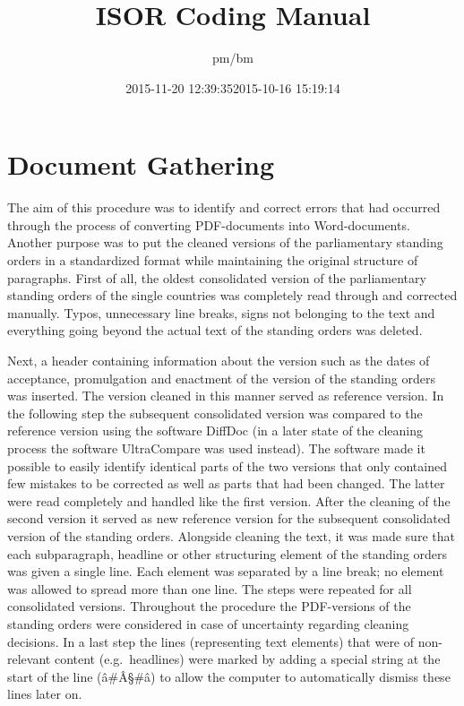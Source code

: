 \documentclass[]{article}
\title{ISOR Coding Manual}
\author{pm/bm}
\date{2015-11-20 12:39:35}
\date{2015-10-16 15:19:14}
\begin{document}
\maketitle

\section{Document Gathering}\label{document-gathering}

The aim of this procedure was to identify and correct errors that had
occurred through the process of converting PDF-documents into
Word-documents. Another purpose was to put the cleaned versions of the
parliamentary standing orders in a standardized format while maintaining
the original structure of paragraphs. First of all, the oldest
consolidated version of the parliamentary standing orders of the single
countries was completely read through and corrected manually. Typos,
unnecessary line breaks, signs not belonging to the text and everything
going beyond the actual text of the standing orders was deleted.

Next, a header containing information about the version such as the
dates of acceptance, promulgation and enactment of the version of the
standing orders was inserted. The version cleaned in this manner served
as reference version. In the following step the subsequent consolidated
version was compared to the reference version using the software DiffDoc
(in a later state of the cleaning process the software UltraCompare was
used instead). The software made it possible to easily identify
identical parts of the two versions that only contained few mistakes to
be corrected as well as parts that had been changed. The latter were
read completely and handled like the first version. After the cleaning
of the second version it served as new reference version for the
subsequent consolidated version of the standing orders. Alongside
cleaning the text, it was made sure that each subparagraph, headline or
other structuring element of the standing orders was given a single
line. Each element was separated by a line break; no element was allowed
to spread more than one line. The steps were repeated for all
consolidated versions. Throughout the procedure the PDF-versions of the
standing orders were considered in case of uncertainty regarding
cleaning decisions. In a last step the lines (representing text
elements) that were of non-relevant content (e.g.~headlines) were marked
by adding a special string at the start of the line (â\#Â§\#â) to allow
the computer to automatically dismiss these lines later on.
\end{document}
